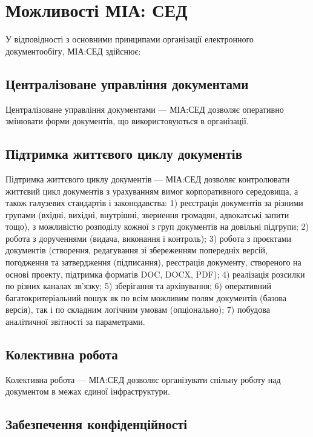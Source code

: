 \chapter{Можливості МІА: СЕД}

У відповідності з основними принципами організації електронного
документообігу, МІА:СЕД здійснює:

\section{Централізоване управління документами}

Централізоване управління документами --- МІА:СЕД дозволяє оперативно
змінювати форми документів, що використовуються в організації.

\section{Підтримка життєвого циклу документів}

Підтримка життєвого циклу документів --- МІА:СЕД дозволяє контролювати
життєвий цикл документів з урахуванням вимог корпоративного середовища, а
також галузевих стандартів і законодавства:
1) реєстрація документів за різними групами (вхідні, вихідні, внутрішні,
звернення громадян, адвокатські запити тощо), з можливістю розподілу
кожної з груп документів на довільні підгрупи;
2) робота з дорученнями (видача, виконання і контроль);
3) робота з проєктами документів (створення, редагування зі збереженням
попередніх версій, погодження та затвердження (підписання), реєстрація
документу, створеного на основі проекту, підтримка форматів DOC, DOCX,
PDF);
4) реалізація розсилки по різних каналах зв’язку;
5) зберігання та архівування;
6) оперативний багатокритеріальний пошук як по всім можливим полям
документів (базова версія), так і по складним логічним умовам
(опціонально);
7) побудова аналітичної звітності за параметрами.

\section{Колективна робота}

Колективна робота --- МІА:СЕД дозволяє організувати спільну роботу над
документом в межах єдиної інфраструктури.

\section{Забезпечення конфіденційності}

